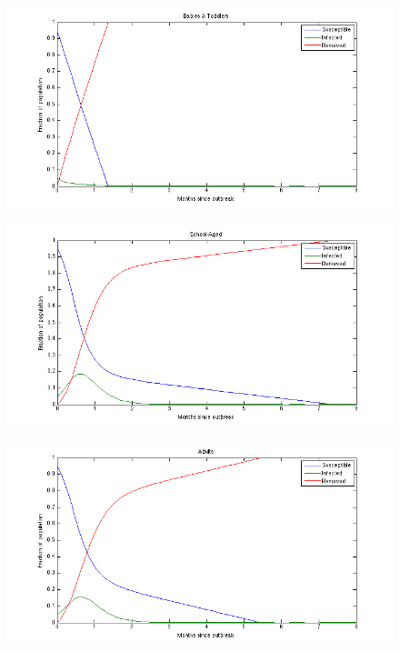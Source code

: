 \documentclass[titlepage]{article}
\begin{document}
    \begin{figure}[H]
    \centering
        \includegraphics[width=\textwidth]{figures/ryan_plot_01.png}
    \end{figure}
    \begin{figure}[H]
    \centering
        \includegraphics[width=\textwidth]{figures/ryan_plot_02.png}
    \end{figure}
    \begin{figure}[H]
    \centering
        \includegraphics[width=\textwidth]{figures/ryan_plot_03.png}
    \end{figure}
\end{document}
